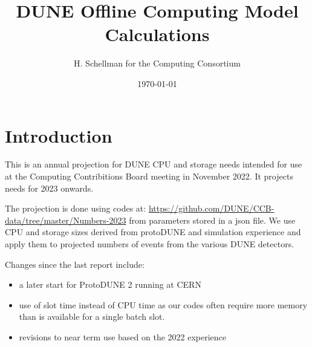 \documentclass[12pt,landscape]{article}
\title{DUNE Offline Computing Model Calculations}
\author{H. Schellman for the Computing Consortium}
\date{\today}
\begin{document}
\makeatletter
{}
\makeatother
\newcommand{\csvautotabularright}[2][]{\csvloop{autotabularright={#2},#1}}

\maketitle
\section{Introduction}

This is an annual projection for DUNE CPU and storage needs intended for use at the Computing Contribitions Board meeting in November 2022. It projects needs for 2023 onwards. 

The projection is done using codes at: \href{https://github.com/DUNE/CCB-data/tree/master/Numbers-2023}{https://github.com/DUNE/CCB-data/tree/master/Numbers-2023} from parameters stored in a json file. We use CPU and storage sizes derived from protoDUNE and simulation experience and apply them to projected numbers of events from the various DUNE detectors. 

Changes since the last report include:

\begin{itemize}
\item a later start for ProtoDUNE 2 running at CERN
\item use of slot time instead of CPU time as our codes often require more memory than is available for a single batch slot. 
\item revisions to near term use based on the 2022 experience
\end{itemize}
\end{document}
